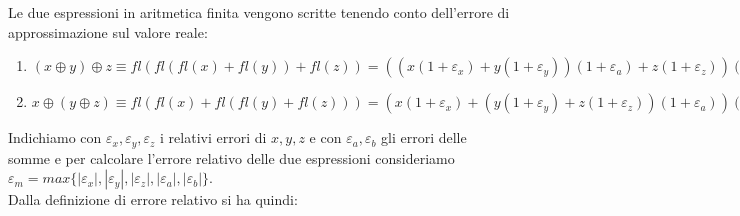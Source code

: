 Le due espressioni in aritmetica finita vengono scritte tenendo conto dell'errore di approssimazione sul valore reale:\\
\begin{enumerate}
	\item $(x \oplus y) \oplus z \equiv fl(fl(fl(x)+fl(y))+fl(z)) = ((x(1+\varepsilon_{x})+y(1+\varepsilon_{y}))(1+\varepsilon_{a})+z(1+\varepsilon_{z}))(1+\varepsilon_{b})$
	\item $x \oplus (y \oplus z) \equiv fl(fl(x)+fl(fl(y)+fl(z))) = (x(1+\varepsilon_{x})+(y(1+\varepsilon_{y})+z(1+\varepsilon_{z}))(1+\varepsilon_{a}))(1+\varepsilon_{b})$\\
\end{enumerate}
Indichiamo con $\varepsilon_{x},\varepsilon_{y},\varepsilon_{z}$ i relativi errori di $x, y, z$ e con $\varepsilon_{a},\varepsilon_{b}$ gli errori delle somme e per calcolare l'errore relativo delle due espressioni consideriamo $\varepsilon_{m} = max\{|\varepsilon_{x}|,|\varepsilon_{y}|,|\varepsilon_{z}|,|\varepsilon_{a}|,|\varepsilon_{b}|\}$.\\
Dalla definizione di errore relativo si ha quindi:\\
